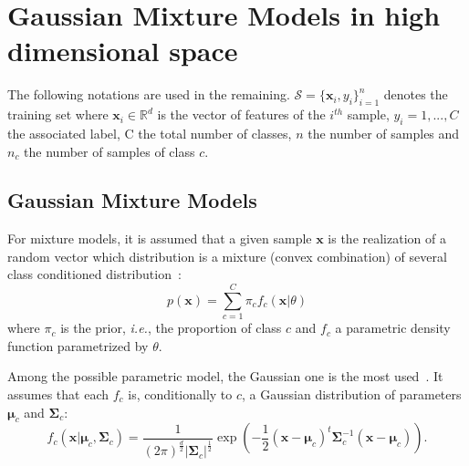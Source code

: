 \documentclass[journal]{IEEEtran}
\begin{document}
\section{Gaussian Mixture Models in high dimensional space}
\label{sec:gmm-hd}

The    following    notations    are   used    in    the    remaining.
$\mathcal{S}  = \{\mathbf{x}_i,y_i\}_{i=1}^{n}$  denotes the  training
set where $\mathbf{x}_i \in \mathbb{R}^d$ is the vector of features of
the $i^{th}$ sample, $y_i = 1,...,C$ the associated label, C the total
number of classes,  $n$ the number of samples and  $n_c$ the number of
samples of class $c$.

    \subsection{Gaussian Mixture Models}

    For mixture models, it is assumed  that a given sample $\mathbf{x}$ is
    the realization  of a  random vector which  distribution is  a mixture
    (convex     combination)     of      several     class     conditioned
    distribution~\cite{Fraley00model-basedclustering}:
    \begin{equation}
        p(\mathbf{x}) = \sum_{c=1}^{C} \pi_c f_c(\mathbf{x}|\theta)
    \end{equation}
    where $\pi_c$ is  the prior, \emph{i.e.}, the  proportion of class
    $c$  and  $f_c$  a  parametric density  function  parametrized  by
    $\theta$.

    Among the possible parametric model,  the Gaussian one is the most
    used~\cite{bouveyron2014model}.   It assumes  that each  $f_c$ is,
    conditionally  to  $c$,  a  Gaussian  distribution  of  parameters
    $\boldsymbol{\mu}_c$    and    $\boldsymbol{\Sigma}_c$:
    \begin{equation*}
        f_c(\mathbf{x}|\boldsymbol{\mu}_c, \boldsymbol{\Sigma}_c) = \frac{1}{(2\pi)^{\frac{d}{2}} |\boldsymbol{\Sigma}_c|^{\frac{1}{2}}} \exp \left( -\frac{1}{2} (\mathbf{x} - \boldsymbol{\mu}_c)^t \boldsymbol{\Sigma}_c^{-1} (\mathbf{x} - \boldsymbol{\mu}_c) \right).
    \end{equation*}
\end{document}
